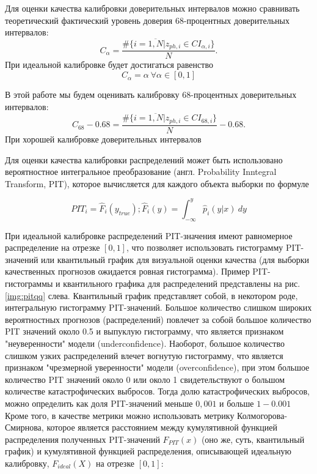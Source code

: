 \documentclass[fleqn,usenatbib]{mnras}
\begin{document}
Для оценки качества калибровки доверительных интервалов можно сравнивать теоретический фактический уровень доверия 68-процентных доверительных интервалов:
\begin{equation}\label{eq:calpha}
    C_{\alpha} = \frac{\#\{i = \overline{1, N} | z_{ph,i} \in CI_{\alpha, i}\}}{N}.
\end{equation}
При идеальной калибровке будет достигаться равенство
\begin{equation}\label{eq:perfect-ci}
    C_{\alpha} = \alpha ~ \forall \alpha \in [0, 1]
\end{equation}

В этой работе мы будем оценивать калибровку 68-процентных доверительных интервалов:
\begin{equation}\label{eq:c68}
    C_{68} - 0.68 = \frac{\#\{i = \overline{1, N} | z_{ph,i} \in CI_{68, i}\}}{N} - 0.68.
\end{equation}
При хорошей калибровке доверительных интервалов 

Для оценки качества калибровки распределений может быть использовано вероятностное интегральное преобразование (англ. Probability Inntegral Transform, PIT), которое вычисляется для каждого объекта выборки по формуле

\begin{equation}\label{eq:pit}
PIT_i = \hat{F}_i(y_{true}); \hat{F}_i(y) = \int_{-\infty}^{y} \hat{p}_i(y|x) ~ dy
\end{equation}

При идеальной калибровке распределений PIT-значения имеют равномерное распределение на отрезке \([0,1]\), что позволяет использовать гистограмму PIT-значений или квантильный график для визуальной оценки качества (для выборки качественных прогнозов ожидается ровная гистограмма). Пример PIT-гистограммы и квантильного графика для распределений представлены на рис. \ref{img:pitqq} слева. Квантильный график представляет собой, в некотором роде, интегральную гистограмму PIT-значений. Большое количество слишком широких вероятностных прогнозов (распределений) повлечет за собой большое количество PIT значений около 0.5 и выпуклую гистограмму, что является признаком "неуверенности" модели (underconfidence). Наоборот, большое количество слишком узких распределений влечет вогнутую гистограмму, что является признаком "чрезмерной уверенности" модели (overconfidence), при этом большое количество PIT значений около 0 или около 1 свидетельствуют о большом количестве катастрофических выбросов. Тогда долю катастрофических выбросов, можно определить как доля PIT-значений меньше \(0,001\) и больше \(1-0.001\) Кроме того, в качестве метрики можно использовать метрику Колмогорова-Смирнова, которое является расстоянием между кумулятивной функцией распределения полученных PIT-значений \(F_{PIT}(x)\) (оно же, суть, квантильный график) и кумулятивной функцией распределения, описывающей идеальную калибровку, \(F_{ideal}(X)\) на отрезке \([0,1]\):
\end{document}
